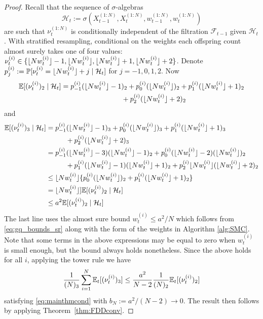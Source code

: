 \begin{proof}
Recall that the sequence of $\sigma$-algebras
\begin{equation}\label{eq:defn_Ht}
\mathcal{H}_t := \sigma(X_{t-1}^{(1:N)}, X_t^{(1:N)}, w_{t-1}^{(1:N)}, w_t^{(1:N)} )
\end{equation}
are such that $\nu_t^{(1:N)}$ is conditionally independent of the filtration $\mathcal{F}_{t-1}$ given $\mathcal{H}_t$.
With stratified resampling, conditional on the weights each offspring count almost surely takes one of four values: $\nu_t^{(i)} \in \{ \lfloor N w_t^{(i)} \rfloor -1, \lfloor N w_t^{(i)} \rfloor, \lfloor N w_t^{(i)} \rfloor +1, \lfloor N w_t^{(i)} \rfloor +2 \}$.  
Denote $p_j^{(i)} := \mathbb{P}[ \nu_t^{(i)} = \lfloor N w_t^{(i)} \rfloor +j \mid \mathcal{H}_t ]$ for $j=-1,0,1,2$.
Now
\begin{align*}
\E [(\nu_t^{(i)})_2 \mid \mathcal{H}_t ]
&= p_{-1}^{(i)} (\flnw -1)_2 + p_0^{(i)} (\flnw)_2 + p_1^{(i)} (\flnw +1)_2 \\
    &\hspace{3cm} + p_2^{(i)} (\flnw +2)_2
\end{align*}
and
\begin{align*}
\mathbb{E} [(\nu_t^{(i)})_3 \mid \mathcal{H}_t ]
&= p_{-1}^{(i)} (\lfloor N w_t^{(i)} \rfloor -1)_3 + p_0^{(i)} (\lfloor N w_t^{(i)} \rfloor)_3 + p_1^{(i)} (\lfloor N w_t^{(i)} \rfloor +1)_3 \\
    &\hspace{1cm} + p_2^{(i)} (\lfloor N w_t^{(i)} \rfloor +2)_3 \\
&= p_{-1}^{(i)} (\lfloor N w_t^{(i)} \rfloor -3)(\lfloor N w_t^{(i)} \rfloor -1)_2 + p_0^{(i)} (\lfloor N w_t^{(i)} \rfloor -2)(\lfloor N w_t^{(i)} \rfloor)_2 \\
     &\hspace{1cm} + p_1^{(i)} (\lfloor N w_t^{(i)} \rfloor -1)(\lfloor N w_t^{(i)} \rfloor +1)_2 
         + p_2^{(i)} \lfloor N w_t^{(i)} \rfloor (\lfloor N w_t^{(i)} \rfloor +2)_2 \\
&\leq \lfloor N w_t^{(i)} \rfloor \{ p_0^{(i)} (\lfloor N w_t^{(i)} \rfloor)_2 + p_1^{(i)} (\lfloor N w_t^{(i)} \rfloor +1)_2 \} \\
&= \lfloor N w_t^{(i)} \rfloor ]\mathbb{E} [(\nu_t^{(i)})_2 \mid \mathcal{H}_t ] \\
&\leq a^2 \mathbb{E} [(\nu_t^{(i)})_2 \mid \mathcal{H}_t ]
\end{align*}
The last line uses the almost sure bound $w_t^{(i)} \leq a^2 /N$ which follows from \eqref{eq:gq_bounds_sr} along with the form of the weights in Algorithm \ref{alg:SMC}.
Note that some terms in the above expressions may be equal to zero when $w_t^{(i)}$ is small enough, but the bound always holds nonetheless.
Since the above holds for all $i$, applying the tower rule we have
\begin{equation*}
\frac{1}{(N)_3} \sum_{i=1}^{N} \mathbb{E}_t [(\nu_t^{(i)})_3 ]
\leq \frac{a^2}{N-2} \frac{1}{(N)_2} \mathbb{E}_t [(\nu_t^{(i)})_2 ]
\end{equation*}
satisfying \eqref{eq:mainthmcond} with $b_N := a^2/(N-2) \rightarrow 0$.
The result then follows by applying Theorem~\ref{thm:FDDconv}.
\end{proof}


